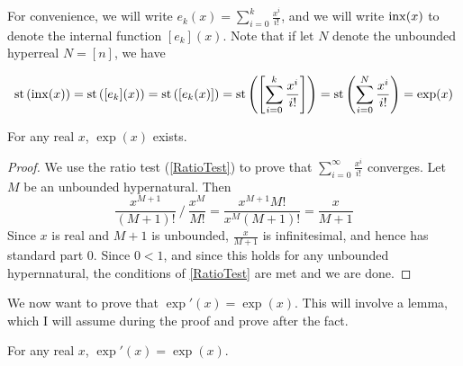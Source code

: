 For convenience, we will write $e_k(x) = \sum_{i=0}^k \frac{x^i}{i!}$, and we will write $\operatorname{inx}(x)$ to denote the internal function $[e_k](x)$. Note that if let $N$ denote the unbounded hyperreal $N = [n]$, we have

\[\operatorname{st}\left(\operatorname{inx}(x)\right) = \operatorname{st}\left([e_k](x)\right) = \operatorname{st}\left([e_k(x)]\right) = \operatorname{st}\left(\left[\sum_{i=0}^k\frac{x^i}{i!}\right]\right) = \operatorname{st}\left(\sum_{i=0}^N \frac{x^i}{i!}\right) = \exp(x) \]

\begin{thm}\label{expExists}
    For any real $x$, $\exp(x)$ exists.
\end{thm}

\begin{proof}
    We use the ratio test (\ref{RatioTest}) to prove that $\sum_{i=0}^\infty \frac{x^i}{i!}$ converges. Let $M$ be an unbounded hypernatural. Then 
    \[
        \frac{x^{M+1}}{(M+1)!} \  / \  \frac{x^M}{M!} = \frac{x^{M+1}M!}{x^M (M+1)!} 
        = \frac{x}{M+1}
    \]
    Since $x$ is real and $M+1$ is unbounded, $\frac{x}{M+1}$ is infinitesimal, and hence has standard part $0$. Since $0 < 1$, and since this holds for any unbounded hypernnatural, the conditions of \ref{RatioTest} are met and we are done.
\end{proof}

We now want to prove that $\exp'(x) = \exp(x)$. This will involve a lemma, which I will assume during the proof and prove after the fact.

\begin{thm}
    For any real $x$, $\exp'(x) = \exp(x)$.
\end{thm}


